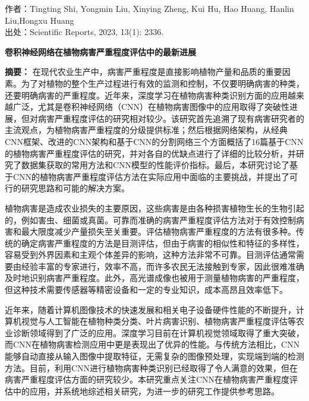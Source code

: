 \renewcommand{\fig}[3]{
	\begin{figure}[!htb]
		\centering
		\texttt{[image: \#1.png]}
		\caption{#3}
		\label{#1-zh}
	\end{figure}
}
\renewcommand{\tab}[3]{
	\begin{table}[!htb]
		\centering
		\caption{#3}
		\label{#1-zh}
		\texttt{[image: \#1.png]}
	\end{table}
}

\songti
\noindent 作者：Tingting Shi, Yongmin Liu, Xinying Zheng, Kui Hu, Hao Huang, Hanlin Liu,Hongxu Huang\\
\noindent 出处：Scientific Reports, 2023, 13(1): 2336.
\vspace{2ex}

\begin{center}
    \textbf{卷积神经网络在植物病害严重程度评估中的最新进展}
\end{center}


\noindent\textbf{摘要：} 在现代农业生产中，病害严重程度是直接影响植物产量和品质的重要因素。为了对植物的整个生产过程进行有效的监测和控制，不仅要明确病害的种类，还要明确病害的严重程度。近年来，深度学习在植物病害种类识别方面的应用越来越广泛，尤其是卷积神经网络（CNN）在植物病害图像中的应用取得了突破性进展，但对病害严重程度评估的研究相对较少。该研究首先追溯了现有病害研究者的主流观点，为植物病害严重程度的分级提供标准；然后根据网络架构，从经典CNN框架、改进的CNN架构和基于CNN的分割网络三个方面概括了16篇基于CNN的植物病害严重程度评估的研究，并对各自的优缺点进行了详细的比较分析，并研究了数据集获取的常用方法和CNN模型的性能评价指标。最后，本研究讨论了基于CNN的植物病害严重程度评估方法在实际应用中面临的主要挑战，并提出了可行的研究思路和可能的解决方案。

植物病害是造成农业损失的主要原因，这些病害是由各种损害植物生长的生物引起的，例如害虫、细菌或真菌。可靠而准确的病害严重程度评估方法对于有效控制病害和最大限度减少产量损失至关重要。评估植物病害严重程度的方法有很多种。传统的确定病害严重程度的方法是目测评估，但由于病害的相似性和特征的多样性，容易受到外界因素和主观个体差异的影响，这种方法非常不可靠。目测评估通常需要由经验丰富的专家进行，效率不高，而许多农民无法接触到专家，因此很难准确及时地识别病害严重程度。此外，高光谱成像也被用于测量植物病害的严重程度，但这种技术需要传感器等精密设备和一定的专业知识，成本高昂且效率低下。

近年来，随着计算机图像技术的快速发展和相关电子设备硬件性能的不断提升，计算机视觉与人工智能在植物种类分类、叶片病害识别、植物病害严重程度评估等农业诊断领域得到了广泛的应用。深度学习目前在计算机视觉领域取得了重大突破，而CNN在植物病害检测应用中更是表现出了优异的性能。与传统方法相比，CNN能够自动直接从输入图像中提取特征，无需复杂的图像预处理，实现端到端的检测方法。目前，利用CNN进行植物病害种类识别已经取得了令人满意的效果，但在病害严重程度评估方面的研究较少。本研究重点关注CNN在植物病害严重程度评估中的应用，并系统地综述相关研究，为进一步的研究工作提供参考思路。

